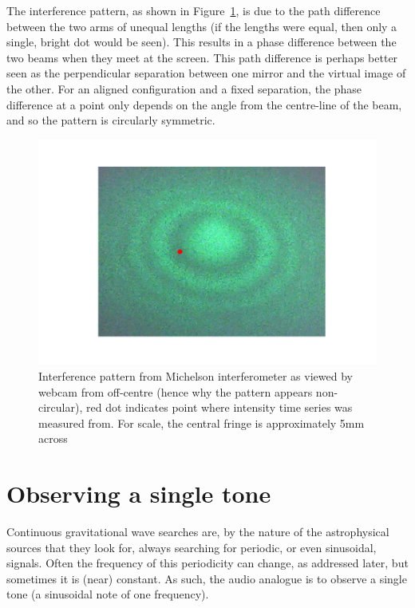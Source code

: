 \documentclass[prb,preprint]{revtex4-1}
\begin{document}
The interference pattern, as shown in Figure~\ref{fig:interference_pattern}, is due to the path difference between the two arms of unequal lengths (if the lengths were equal, then only a single, bright dot would be seen). This results in a phase difference between the two beams when they meet at the screen. This path difference is perhaps better seen as the perpendicular separation between one mirror and the virtual image of the other.
For an aligned configuration and a fixed separation, the phase difference at a point only depends on the angle from the centre-line of the beam, and so the pattern is circularly symmetric.

\begin{figure}
	\includegraphics[width=\textwidth]{figures/webcam_still0.pdf}
	\caption{Interference pattern from Michelson interferometer as viewed by webcam from off-centre (hence why the pattern appears non-circular), red dot indicates point where intensity time series was measured from. For scale, the central fringe is approximately 5mm across}
	\label{fig:interference_pattern}
\end{figure}


\section{Observing a single tone}
\label{sec:single_tone}

Continuous gravitational wave searches are, by the nature of the astrophysical sources that they look for, always searching for periodic, or even sinusoidal, signals. Often the frequency of this periodicity can change, as addressed later, but sometimes it is (near) constant. As such, the audio analogue is to observe a single tone (a sinusoidal note of one frequency).
\end{document}

